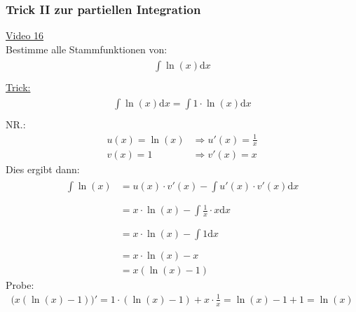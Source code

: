 \subsubsection{Trick II zur partiellen Integration}
\href{https://youtu.be/TbMWPRG4Ffw}{Video 16}\\
Bestimme alle Stammfunktionen von:\\
\begin{align*}
\int\limits_{}^{}\ln(x)\mathrm{d}x
\end{align*}
\underline{Trick:}\\
\begin{align*}
\int\limits_{}^{} \ln(x)\mathrm{d}x=\int\limits_{}^{} 1\cdot \ln(x)\mathrm{d}x
\end{align*}
NR.:\
\begin{align*}
u(x)=\ln(x)&\Rightarrow u'(x)=\frac{1}{x}\\
v(x)=1&\Rightarrow v'(x)=x
\end{align*}
Dies ergibt dann:\\
\begin{align*}
\int\limits_{}^{} \ln(x)&=u(x) \cdot v'(x)-\int\limits_{}^{} u'(x)\cdot v'(x)\mathrm{d}x\\
&=x\cdot \ln(x)-\int\limits_{}^{} \frac{1}{x}\cdot x\mathrm{d}x\\
&=x\cdot \ln(x)-\int\limits_{}^{}1\mathrm{d}x\\
&=x\cdot \ln(x)-x\\
&=x(\ln(x)-1)
\end{align*}
Probe:\\
\begin{align*}
\bigg(x(\ln(x)-1)\bigg)'=1\cdot (\ln(x)-1)+x\cdot \frac{1}{x}=\ln(x)-1+1=\ln(x)\\
\end{align*}
